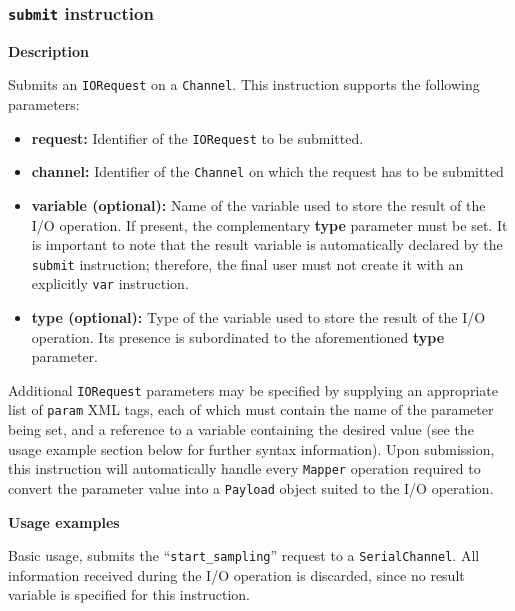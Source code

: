 \subsubsection{\texttt{submit} instruction}

\textbf{Description}

Submits an \texttt{IORequest} on a \texttt{Channel}. This instruction supports
the following parameters:

\begin{itemize}

    \item \textbf{request:} Identifier of the \texttt{IORequest} to be
        submitted.

    \item \textbf{channel:} Identifier of the \texttt{Channel} on which the
        request has to be submitted

    \item \textbf{variable (optional):} Name of the variable used to store the
        result of the I/O operation. If present, the complementary
        \textbf{type} parameter must be set. It is important to note that the
        result variable is automatically declared by the \texttt{submit}
        instruction; therefore, the final user must not create it with an
        explicitly \texttt{var} instruction.

    \item \textbf{type (optional):} Type of the variable used to store the
        result of the I/O operation. Its presence is subordinated to the
        aforementioned \textbf{type} parameter.

\end{itemize}

Additional \texttt{IORequest} parameters may be specified by supplying an
appropriate list of \texttt{param} XML tags, each of which must contain the
name of the parameter being set, and a reference to a variable containing the
desired value (see the usage example section below for further syntax
information). Upon submission, this instruction will automatically handle every
\texttt{Mapper} operation required to convert the parameter value into a
\texttt{Payload} object suited to the I/O operation.

\textbf{Usage examples}

Basic usage, submits the ``\texttt{start\_sampling}'' request to a
\texttt{SerialChannel}. All information received during the I/O operation is
discarded, since no result variable is specified for this instruction.


